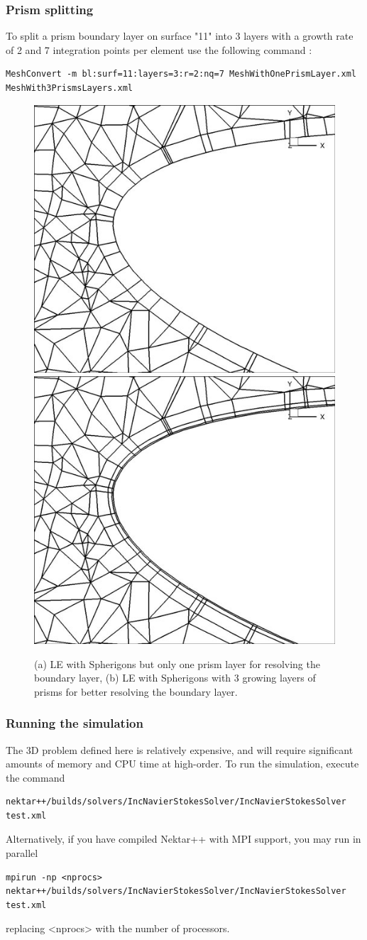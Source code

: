 \subsubsection{Prism splitting}
To split a prism boundary layer on surface "11" into 3 layers with a growth rate of 2 and 7 integration points per element use the following command :
\begin{lstlisting}[style=XmlStyle]
MeshConvert -m bl:surf=11:layers=3:r=2:nq=7 MeshWithOnePrismLayer.xml
MeshWith3PrismsLayers.xml
\end{lstlisting}
\begin{figure}[!htbp]
\begin{center}
\includegraphics[width = 0.47 \textwidth]{Figures/SphnoBL.jpg}
\includegraphics[width = 0.47 \textwidth]{Figures/SphBL.jpg}
\caption{(a) LE with Spherigons but only one prism layer for resolving the boundary layer, (b)  LE with Spherigons with 3 growing layers of prisms for better resolving the boundary layer.}
\label{fig:}
\end{center}
\end{figure}

\subsubsection{Running the simulation}
The 3D problem defined here is relatively expensive, and will require significant amounts of memory and CPU time at high-order. To run the simulation, execute the command
\begin{lstlisting}[style=XmlStyle]
nektar++/builds/solvers/IncNavierStokesSolver/IncNavierStokesSolver test.xml
\end{lstlisting}
Alternatively, if you have compiled Nektar++ with MPI support, you may run in parallel
\begin{lstlisting}[style=XmlStyle]
mpirun -np <nprocs> nektar++/builds/solvers/IncNavierStokesSolver/IncNavierStokesSolver
test.xml
\end{lstlisting}
replacing <nprocs> with the number of processors.

